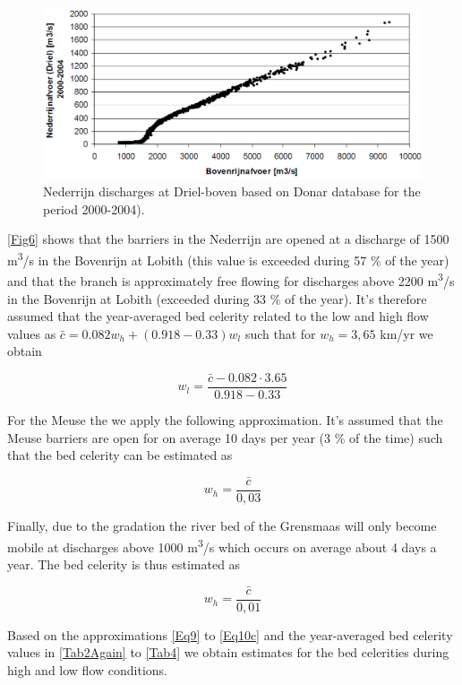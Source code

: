 \begin{figure}
\includegraphics[width=\columnwidth]{figures/Fig6.png}
\caption{Nederrijn discharges at Driel-boven based on Donar database for the period 2000-2004).}
\label{Fig6}
\end{figure}

\autoref{Fig6} shows that the barriers in the Nederrijn are opened at a discharge of 1500 m\textsuperscript{3}/s in the Bovenrijn at Lobith (this value is exceeded during 57 \% of the year) and that the branch is approximately free flowing for discharges above 2200 m\textsuperscript{3}/s in the Bovenrijn at Lobith (exceeded during 33 \% of the year).
It's therefore assumed that the year-averaged bed celerity related to the low and high flow values as $\bar{c} = 0.082 w_h + (0.918 - 0.33) w_l$ such that for $w_h = 3,65$ km/yr we obtain

\begin{equation}
w_l = \frac{\bar{c} - 0.082 \cdot 3.65}{0.918 - 0.33}
\label{Eq10a}
\end{equation}

For the Meuse the we apply the following approximation.
It's assumed that the Meuse barriers are open for on average 10 days per year (3 \% of the time) such that the bed celerity can be estimated as

\begin{equation}
w_h = \frac{\bar{c}}{0,03}
\label{10b}
\end{equation}


Finally, due to the gradation the river bed of the Grensmaas will only become mobile at discharges above 1000 m\textsuperscript{3}/s which occurs on average about 4 days a year.
The bed celerity is thus estimated as

\begin{equation}
w_h = \frac{\bar{c}}{0,01}
\label{Eq10c}
\end{equation}

Based on the approximations \autoref{Eq9} to \autoref{Eq10c} and the year-averaged bed celerity values in \autoref{Tab2Again} to \autoref{Tab4} we obtain estimates for the bed celerities during high and low flow conditions.

